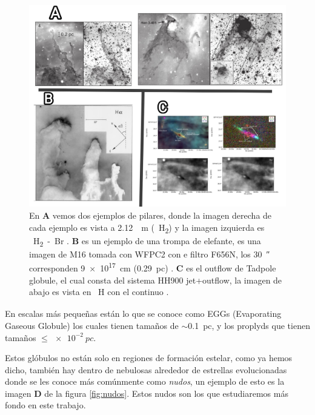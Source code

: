 \documentclass{book}
\begin{document}
\begin{figure}[h]
    \centering
    \includegraphics[width=1 \textwidth]{images Chapter 1/C1_Pillars.jpg}
    \caption{En \textbf{A} vemos dos ejemplos de pilares, donde la imagen derecha de cada ejemplo es vista a \SI{2.12}{\mu m} (\SI{}{H_2}) y la imagen izquierda es \SI{}{H_2-Br_{\gamma}} \citep{Hartigan:2015}. \textbf{B} es un ejemplo de una trompa de elefante, es una imagen de M16 tomada con WFPC2 con e filtro F656N, los \SI{30}{\arcsecond} corresponden \SI{9e17}{cm} (\SI{0.29}{pc}) \citep{JJHester:1996}. \textbf{C} es el outflow de Tadpole globule, el cual consta del sistema HH900 jet+outflow, la imagen de abajo es vista en \SI{}{H_\alpha} con el continuo 
    \citep{MeganReiter:2019}. }
    \label{fig:Pillars}
\end{figure}

En escalas más pequeñas están lo que se conoce como EGGs (Evaporating Gaseous Globule) los cuales tienen tamaños de $\sim$\SI{0.1}{pc}, y los proplyds que tienen tamaños $\le\SI{e-2}{pc}$. 


Estos glóbulos no están solo en regiones de formación estelar, como ya hemos dicho, también hay dentro de nebulosas alrededor de estrellas evolucionadas donde se les conoce más comúnmente como \textit{nudos}, un ejemplo de esto es la imagen \textbf{D} de la figura \ref{fig:nudos}. Estos nudos son los que estudiaremos más fondo en este trabajo.
\end{document}
